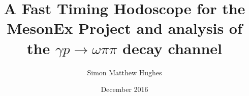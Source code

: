 \documentclass[a4paper,12pt,oneside,openright]{book}
\title{A Fast Timing Hodoscope for the MesonEx Project and analysis of the $\gamma p \rightarrow \omega\pi\pi$ decay channel}
\author{Simon Matthew Hughes}
\date{December 2016} %
\begin{document}
\singlespacing
\maketitlepage
\frontmatter
\eighteenptleading



% 

\tableofcontents

% 

\mainmatter
\eighteenptleading
%










\end{document}
